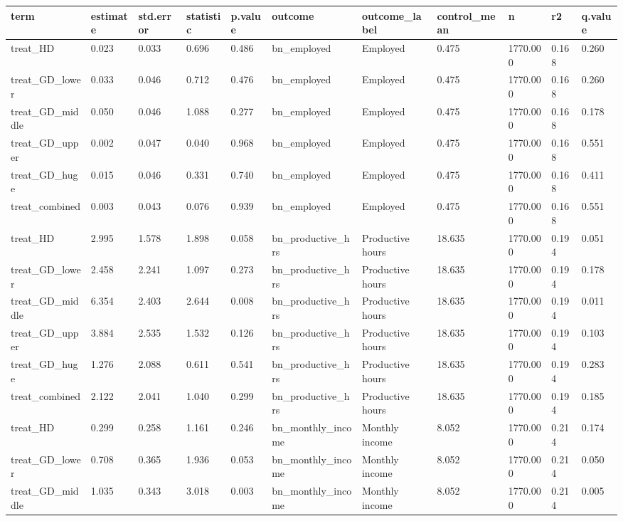 \begin{tabular}{lllllllllll}
\toprule
term & estimate & std.error & statistic & p.value & outcome & outcome\_label & control\_mean & n & r2 & q.value
 \\
\midrule
treat\_HD & 0.023 & 0.033 & 0.696 & 0.486 & bn\_employed & Employed & 0.475 & 1770.000 & 0.168 & 0.260 \\
treat\_GD\_lower & 0.033 & 0.046 & 0.712 & 0.476 & bn\_employed & Employed & 0.475 & 1770.000 & 0.168 & 0.260 \\
treat\_GD\_middle & 0.050 & 0.046 & 1.088 & 0.277 & bn\_employed & Employed & 0.475 & 1770.000 & 0.168 & 0.178 \\
treat\_GD\_upper & 0.002 & 0.047 & 0.040 & 0.968 & bn\_employed & Employed & 0.475 & 1770.000 & 0.168 & 0.551 \\
treat\_GD\_huge & 0.015 & 0.046 & 0.331 & 0.740 & bn\_employed & Employed & 0.475 & 1770.000 & 0.168 & 0.411 \\
treat\_combined & 0.003 & 0.043 & 0.076 & 0.939 & bn\_employed & Employed & 0.475 & 1770.000 & 0.168 & 0.551 \\
treat\_HD & 2.995 & 1.578 & 1.898 & 0.058 & bn\_productive\_hrs & Productive hours & 18.635 & 1770.000 & 0.194 & 0.051 \\
treat\_GD\_lower & 2.458 & 2.241 & 1.097 & 0.273 & bn\_productive\_hrs & Productive hours & 18.635 & 1770.000 & 0.194 & 0.178 \\
treat\_GD\_middle & 6.354 & 2.403 & 2.644 & 0.008 & bn\_productive\_hrs & Productive hours & 18.635 & 1770.000 & 0.194 & 0.011 \\
treat\_GD\_upper & 3.884 & 2.535 & 1.532 & 0.126 & bn\_productive\_hrs & Productive hours & 18.635 & 1770.000 & 0.194 & 0.103 \\
treat\_GD\_huge & 1.276 & 2.088 & 0.611 & 0.541 & bn\_productive\_hrs & Productive hours & 18.635 & 1770.000 & 0.194 & 0.283 \\
treat\_combined & 2.122 & 2.041 & 1.040 & 0.299 & bn\_productive\_hrs & Productive hours & 18.635 & 1770.000 & 0.194 & 0.185 \\
treat\_HD & 0.299 & 0.258 & 1.161 & 0.246 & bn\_monthly\_income & Monthly income & 8.052 & 1770.000 & 0.214 & 0.174 \\
treat\_GD\_lower & 0.708 & 0.365 & 1.936 & 0.053 & bn\_monthly\_income & Monthly income & 8.052 & 1770.000 & 0.214 & 0.050 \\
treat\_GD\_middle & 1.035 & 0.343 & 3.018 & 0.003 & bn\_monthly\_income & Monthly income & 8.052 & 1770.000 & 0.214 & 0.005 \\

\end{tabular}
